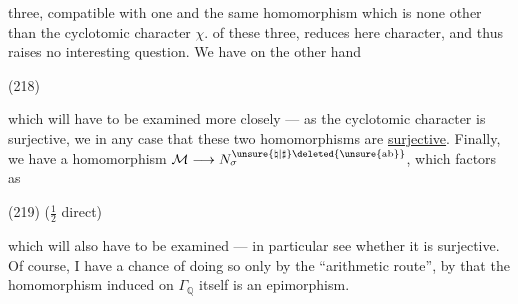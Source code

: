 
three, compatible with one and the same homomorphism
which is none other than the cyclotomic character $\chi$.
 of these three,
reduces here  character, and thus raises no interesting question. We have on the other hand

\noindent (218)\quad
{}

which will have to be examined more closely --- as the cyclotomic character is  surjective, we  in any case that these two homomorphisms are \uline{surjective}. Finally, we have a homomorphism
$\mathcal M\longrightarrow N_{\sigma}^{\unsure{\natural|\sharp}\deleted{\unsure{\mathrm{ab}}}}$, which factors as

\noindent (219)\quad
{}
\hfill ($\frac12$ direct)

which will also have to be examined --- in particular see whether it is surjective.
Of course, I have a chance of doing so only by the ``arithmetic route'', by  that the homomorphism induced on $\Gamma_{\mathbb Q}$ itself is an epimorphism.

